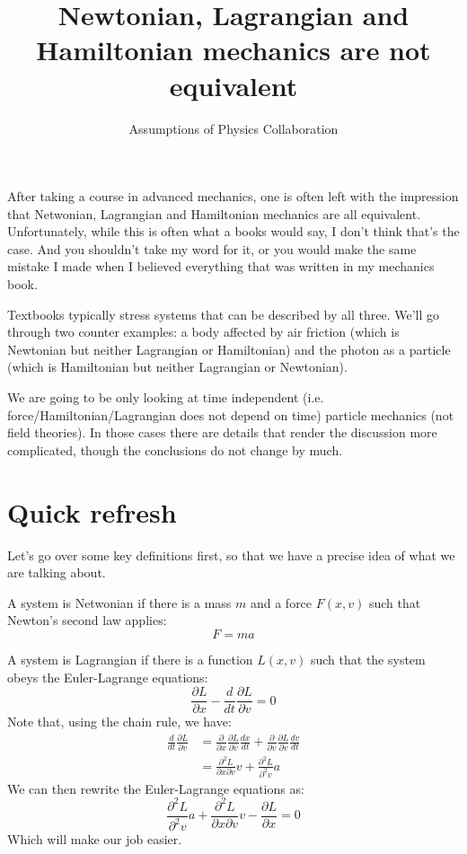 \documentclass[11pt]{article}
\begin{document}
	
	
	\title{Newtonian, Lagrangian and Hamiltonian mechanics are not equivalent}
	\author{Assumptions of Physics Collaboration}
	
	\date{}
	
	\maketitle
	
After taking a course in advanced mechanics, one is often left with the impression that Netwonian, Lagrangian and Hamiltonian mechanics are all equivalent. Unfortunately, while this is often what a books would say, I don't think that's the case. And you shouldn't take my word for it, or you would make the same mistake I made when I believed everything that was written in my mechanics book.

Textbooks typically stress systems that can be described by all three. We'll go through two counter examples: a body affected by air friction (which is Newtonian but neither Lagrangian or Hamiltonian) and the photon as a particle (which is Hamiltonian but neither Lagrangian or Newtonian). 

We are going to be only looking at time independent (i.e. force/Hamiltonian/Lagrangian does not depend on time) particle mechanics (not field theories). In those cases there are details that render the discussion more complicated, though the conclusions do not change by much.

\section{Quick refresh}

Let's go over some key definitions first, so that we have a precise idea of what we are talking about.

A system is Netwonian if there is a mass $m$ and a force $F(x,v)$ such that Newton's second law applies:
\begin{equation}
\label{Fma}
F=ma
\end{equation}

A system is Lagrangian if there is a function $L(x,v)$ such that the system obeys the Euler-Lagrange equations:
\begin{equation}
\label{EulerLagrange}
\frac{\partial L}{\partial x} - \frac{d}{dt} \frac{\partial L}{\partial v} = 0
\end{equation}
Note that, using the chain rule, we have:
\begin{align*}
\frac{d}{dt} \frac{\partial L}{\partial v} &= \frac{\partial}{\partial x} \frac{\partial L}{\partial v} \frac{dx}{dt} + \frac{\partial}{\partial v}  \frac{\partial L}{\partial v} \frac{dv}{dt} \\
&= \frac{\partial^2 L}{\partial x \partial v} v + \frac{\partial^2 L}{\partial^2 v} a
\end{align*}
We can then rewrite the Euler-Lagrange equations as:
\begin{equation}
\label{EulerLagrangeMod}
\frac{\partial^2 L}{\partial^2 v} a + \frac{\partial^2 L}{\partial x \partial v} v - \frac{\partial L}{\partial x}=0
\end{equation}
Which will make our job easier.
\end{document}
